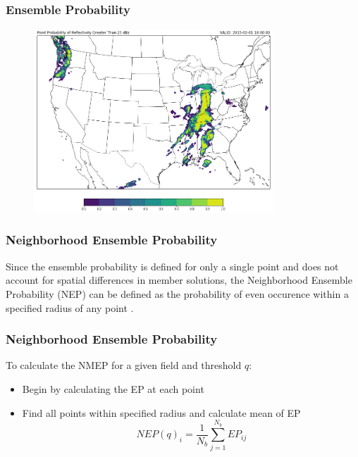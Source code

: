 \documentclass{beamer}
\begin{document}
\begin{frame}
  \frametitle{Ensemble Probability}
  \begin{figure}
    \includegraphics[width=0.8\textwidth]{probs}
\end{figure}
\end{frame}

\begin{frame}
  \frametitle{Neighborhood Ensemble Probability}
  Since the ensemble probability is defined for only a single point and does not account for spatial differences in member solutions, the Neighborhood Ensemble Probability (NEP) can be defined as the probability of even occurence within a specified radius of any point \citep{Schwartz2017}. 
\end{frame}

\begin{frame}
  \frametitle{Neighborhood Ensemble Probability}
  To calculate the NMEP for a given field and threshold $q$:
  \begin{itemize}
    \item Begin by calculating the EP at each point
    \item Find all points within specified radius and calculate mean of EP
    \begin{equation}
      NEP(q)_{i} = \frac{1}{N_b}\sum^{N_b}_{j=1}EP_{ij}
    \end{equation}
  \end{itemize}
\end{frame}
\end{document}
